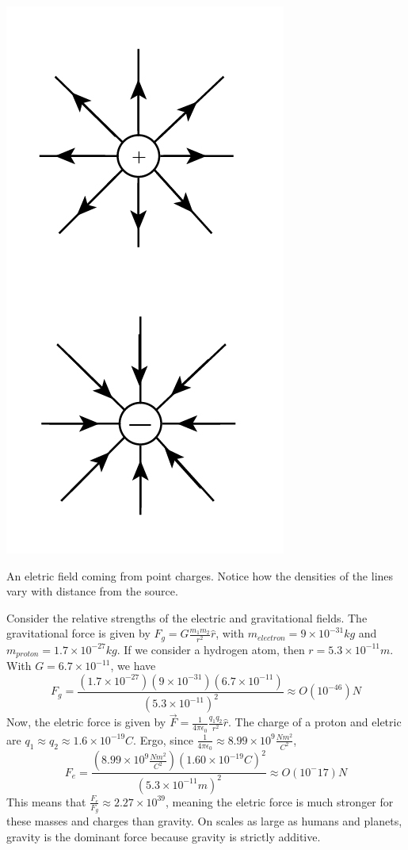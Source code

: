 \documentclass[nobib]{tufte-handout}
\begin{document}
\begin{marginfigure}
    \includegraphics{electricfieldlines.jpg}
    \caption{An eletric field coming from point charges. 
    Notice how the densities of the lines vary with distance from the source.}
    \label{fig:electric-field-lines-point-charge}
\end{marginfigure}

Consider the relative strengths of the electric and 
gravitational fields. The gravitational force is given by
$F_g = G\frac{m_1m_2}{r^2}\hat{r}$, with $m_{electron} = 9 \times 10^{-31} kg$
and $m_{proton} = 1.7 \times 10^{-27} kg$. If we consider a hydrogen atom,  
then $r = 5.3 \times 10^{-11} m$. With $G = 6.7 \times 10^{-11}$, we have 
\[F_g = \frac{(1.7 \times 10^{-27})(9 \times 10^{-31})(6.7 \times 10^{-11})}{(5.3 \times 10^{-11})^2} \approx O(10^{-46})N\]
Now, the eletric force is given by $\vec{F} = \frac{1}{4\pi \epsilon_0}\frac{q_1 q_2}{r^2}\hat{r}$. 
The charge of a proton and eletric are $q_1 \approx q_2 \approx 1.6 \times 10^{-19} C$.
Ergo, since $\frac{1}{4\pi \epsilon_0} \approx 8.99 \times 10^9 \frac{Nm^2}{C^2}$, 
\[F_e = \frac{(8.99 \times 10^9 \frac{Nm^2}{C^2})(1.60\times10^{-19}C)^2}{(5.3\times10^{-11}m)^2} \approx O(10^-17)N\]
This means that $\frac{F_e}{F_g}\approx 2.27 \times 10^{39}$, meaning the eletric force is
much stronger for these masses and charges than gravity. On scales as large as humans and planets,
gravity is the dominant force because gravity is strictly additive.
\end{document}
